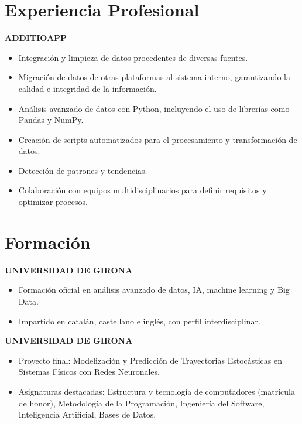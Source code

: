 \documentclass[11pt,a4paper]{article}
\newcommand{\runsubsection}[1]{\color{subheadings}\fontsize{12pt}{12pt}\selectfont\bfseries\uppercase{#1}\normalfont}
\newcommand{\descript}[1]{\color{subheadings}\raggedright\scshape\fontsize{11pt}{13pt}\selectfont{#1 \\}\normalfont}
\newcommand{\location}[1]{\color{headings}\raggedright\fontsize{10pt}{12pt}\selectfont{#1\\}\normalfont}
\newcommand{\sectionsep}{\vspace{8pt}}
\newenvironment{tightemize}{\vspace{-\topsep}\begin{itemize}\itemsep1pt \parskip0pt \parsep0pt}{\end{itemize}\vspace{-\topsep}}
\begin{document}
\begin{multicols}{2}

\section{Experiencia Profesional}

\runsubsection{AdditioApp}
\descript{Data Science}
\location{Octubre 2024 – Actualidad | Girona}
\sectionsep
\begin{tightemize}
    \item Integración y limpieza de datos procedentes de diversas fuentes.
    \item Migración de datos de otras plataformas al sistema interno, garantizando la calidad e integridad de la información.
    \item Análisis avanzado de datos con Python, incluyendo el uso de librerías como Pandas y NumPy.
    \item Creación de scripts automatizados para el procesamiento y transformación de datos.
    \item Detección de patrones y tendencias.
    \item Colaboración con equipos multidisciplinarios para definir requisitos y optimizar procesos.
\end{tightemize}
\sectionsep


\section{Formación}

\runsubsection{Universidad de Girona}

\descript{Máster en Ciencia de Datos}
\location{2025 – 2026 (en curso) | Girona}
\sectionsep
\begin{tightemize}
\item Formación oficial en análisis avanzado de datos, IA, machine learning y Big Data.
\item Impartido en catalán, castellano e inglés, con perfil interdisciplinar.
\end{tightemize}
\sectionsep

\runsubsection{Universidad de Girona}

\descript{Grado en Ingeniería Informática}
\location{2021 – 2025 | Girona}
\sectionsep
\begin{tightemize}
\item Proyecto final: Modelización y Predicción de Trayectorias Estocásticas en Sistemas Físicos con Redes Neuronales.
\item Asignaturas destacadas: Estructura y tecnología de computadores (matrícula de honor), Metodología de la Programación, Ingeniería del Software, Inteligencia Artificial, Bases de Datos.
\end{tightemize}
\sectionsep


\end{multicols}
\end{document}
